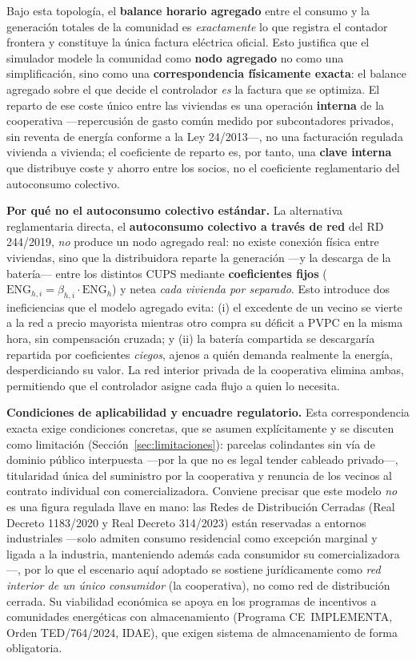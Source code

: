 \documentclass[12pt, a4paper, twoside]{report}
\begin{document}
Bajo esta topología, el \textbf{balance horario agregado} entre el consumo y la
generación totales de la comunidad es \emph{exactamente} lo que registra el
contador frontera y constituye la única factura eléctrica oficial. Esto justifica
que el simulador modele la comunidad como \textbf{nodo agregado} no como una
simplificación, sino como una \textbf{correspondencia físicamente exacta}: el
balance agregado sobre el que decide el controlador \emph{es} la factura que se
optimiza. El reparto de ese coste único entre las viviendas es una operación
\textbf{interna} de la cooperativa —repercusión de gasto común medido por
subcontadores privados, sin reventa de energía conforme a la Ley 24/2013—, no una
facturación regulada vivienda a vivienda; el coeficiente de reparto es, por tanto,
una \textbf{clave interna} que distribuye coste y ahorro entre los socios, no el
coeficiente reglamentario del autoconsumo colectivo.

\textbf{Por qué no el autoconsumo colectivo estándar.} La alternativa
reglamentaria directa, el \textbf{autoconsumo colectivo a través de red} del
RD 244/2019, \emph{no} produce un nodo agregado real: no existe conexión física
entre viviendas, sino que la distribuidora reparte la generación —y la descarga
de la batería— entre los distintos CUPS mediante \textbf{coeficientes fijos}
($\text{ENG}_{h,i}=\beta_{h,i}\cdot\text{ENG}_h$) y netea \emph{cada vivienda por
separado}. Esto introduce dos ineficiencias que el modelo agregado evita:
(i) el excedente de un vecino se vierte a la red a precio mayorista mientras otro
compra su déficit a PVPC en la misma hora, sin compensación cruzada; y (ii) la
batería compartida se descargaría repartida por coeficientes \emph{ciegos},
ajenos a quién demanda realmente la energía, desperdiciando su valor. La red
interior privada de la cooperativa elimina ambas, permitiendo que el controlador
asigne cada flujo a quien lo necesita.

\textbf{Condiciones de aplicabilidad y encuadre regulatorio.} Esta
correspondencia exacta exige condiciones concretas, que se asumen explícitamente
y se discuten como limitación (Sección~\ref{sec:limitaciones}): parcelas
colindantes sin vía de dominio público interpuesta —por la que no es legal tender
cableado privado—, titularidad única del suministro por la cooperativa y renuncia
de los vecinos al contrato individual con comercializadora. Conviene precisar que
este modelo \emph{no} es una figura regulada llave en mano: las Redes de
Distribución Cerradas (Real Decreto 1183/2020 y Real Decreto 314/2023) están
reservadas a entornos industriales —solo admiten consumo residencial como
excepción marginal y ligada a la industria, manteniendo además cada consumidor su
comercializadora—, por lo que el escenario aquí adoptado se sostiene jurídicamente
como \emph{red interior de un único consumidor} (la cooperativa), no como red de
distribución cerrada. Su viabilidad económica se apoya en los programas de
incentivos a comunidades energéticas con almacenamiento (Programa CE~IMPLEMENTA,
Orden TED/764/2024, IDAE), que exigen sistema de almacenamiento de forma
obligatoria.
\end{document}
